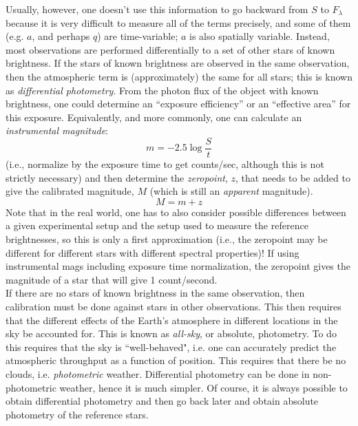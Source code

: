 \documentclass[12pt]{article}
\begin{document}
\noindent Usually, however, one doesn't use this information to go
backward from $S$ to $F_{\lambda}$ because it is very
difficult to measure all of the terms precisely, and some of them
(e.g. $a$, and perhaps $q$) are time-variable; $a$ is also spatially
variable. Instead, most observations are performed differentially to a
set of other stars of known brightness. If the stars of known
brightness are observed in the same observation, then the atmospheric
term is (approximately) the same for all stars; this is known as
\emph{differential photometry}. From the photon flux of the object with known
brightness, one could determine an ``exposure efficiency''
or an ``effective area'' for this
exposure. Equivalently, and more commonly, one can calculate an
\emph{instrumental magnitude}:
\begin{equation*}
    m = -2.5 \log \frac{S}{t}
\end{equation*}
(i.e., normalize by the exposure time to get counts/sec, although this
is not strictly necessary) and then determine the \emph{zeropoint},
$z$, that needs
to be added to give the calibrated magnitude, $M$
(which is still an \emph{apparent} magnitude).
\begin{equation*}
    M = m + z
\end{equation*}
Note that in the real world, one has to also consider possible
differences between a given experimental setup and the setup used to
measure the reference brightnesses, so this is only a first
approximation (i.e., the zeropoint may be different for different
stars with different spectral properties)! If using instrumental mags
including exposure time normalization, the zeropoint gives the
magnitude of a star that will give 1 count/second.\\

\noindent If there are no stars of known brightness in the same
observation, then calibration must be done against stars in other
observations. This then requires that the different effects of the
Earth's atmosphere in different locations in the sky be accounted for.
This is known as \emph{all-sky}, or absolute, photometry. To do this requires
that the sky is ``well-behaved", i.e. one can accurately predict the
atmospheric throughput as a function of position. This requires that
there be no clouds, i.e. \emph{photometric} weather. Differential photometry
can be done in non-photometric weather, hence it is much simpler. Of
course, it is always possible to obtain differential photometry and
then go back later and obtain absolute photometry of the reference
stars.
\end{document}

